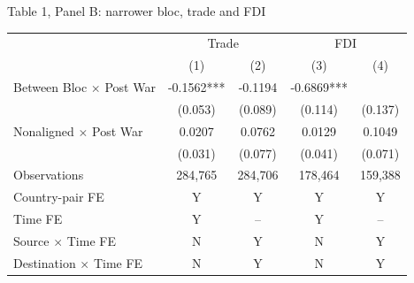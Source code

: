 \documentclass[11pt]{beamer}
\newcommand{\slideclaim}[1]{\vspace{-0.1cm}{#1}}
\newcommand{\hit}[1]{\fcolorbox{darkred}{white}{\strut #1}}
\begin{document}
\begin{frame}{Table 1, Panel B: narrower bloc, trade and FDI}
  \begin{center}
    \begin{adjustbox}{max width=\textwidth}
      \begin{tabular}{lcccc}
        \toprule
                                       & \multicolumn{2}{c}{Trade} & \multicolumn{2}{c}{FDI}                                \\
                                       & (1)                       & (2)                     & (3)        & (4)             \\
        \midrule
        Between Bloc $\times$ Post War & -0.1562***                & -0.1194                 & -0.6869*** & \hit{-0.2697**} \\
                                       & (0.053)                   & (0.089)                 & (0.114)    & (0.137)         \\
        Nonaligned $\times$ Post War   & 0.0207                    & 0.0762                  & 0.0129     & 0.1049          \\
                                       & (0.031)                   & (0.077)                 & (0.041)    & (0.071)         \\
        Observations                   & 284,765                   & 284,706                 & 178,464    & 159,388         \\
        Country-pair FE                & Y                         & Y                       & Y          & Y               \\
        Time FE                        & Y                         & --                      & Y          & --              \\
        Source $\times$ Time FE        & N                         & Y                       & N          & Y               \\
        Destination $\times$ Time FE   & N                         & Y                       & N          & Y               \\
        \bottomrule
      \end{tabular}
    \end{adjustbox}
  \end{center}
  \slideclaim{The narrower classification is more conservative. The FDI shortfall remains clear, while trade becomes less precise once country time shocks are absorbed.}
\end{frame}
\end{document}
